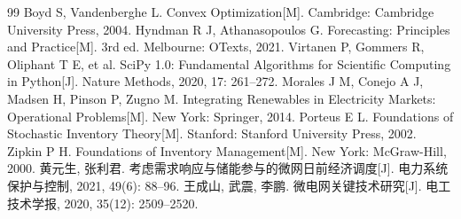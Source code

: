 
\begin{thebibliography}{99}
 Boyd S, Vandenberghe L. Convex Optimization[M]. Cambridge: Cambridge University Press, 2004.
 Hyndman R J, Athanasopoulos G. Forecasting: Principles and Practice[M]. 3rd ed. Melbourne: OTexts, 2021.
 Virtanen P, Gommers R, Oliphant T E, et al. SciPy 1.0: Fundamental Algorithms for Scientific Computing in Python[J]. Nature Methods, 2020, 17: 261--272.
 Morales J M, Conejo A J, Madsen H, Pinson P, Zugno M. Integrating Renewables in Electricity Markets: Operational Problems[M]. New York: Springer, 2014.
 Porteus E L. Foundations of Stochastic Inventory Theory[M]. Stanford: Stanford University Press, 2002.
 Zipkin P H. Foundations of Inventory Management[M]. New York: McGraw-Hill, 2000.
 黄元生, 张利君. 考虑需求响应与储能参与的微网日前经济调度[J]. 电力系统保护与控制, 2021, 49(6): 88--96.
 王成山, 武震, 李鹏. 微电网关键技术研究[J]. 电工技术学报, 2020, 35(12): 2509--2520.
\end{thebibliography}
